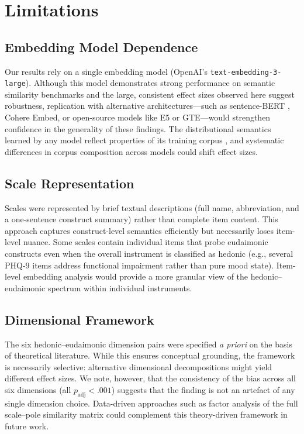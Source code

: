 \documentclass[12pt,a4paper]{article}
\begin{document}
\section{Limitations}\label{sec:limitations}

\subsection{Embedding Model Dependence}

Our results rely on a single embedding model (OpenAI's \texttt{text-embedding-3-large}).
Although this model demonstrates strong performance on semantic similarity benchmarks and the large, consistent effect sizes observed here suggest robustness, replication with alternative architectures---such as sentence-BERT \citep{devlin2019bert}, Cohere Embed, or open-source models like E5 or GTE---would strengthen confidence in the generality of these findings.
The distributional semantics learned by any model reflect properties of its training corpus \citep{bender2021dangers}, and systematic differences in corpus composition across models could shift effect sizes.

\subsection{Scale Representation}

Scales were represented by brief textual descriptions (full name, abbreviation, and a one-sentence construct summary) rather than complete item content.
This approach captures construct-level semantics efficiently but necessarily loses item-level nuance.
Some scales contain individual items that probe eudaimonic constructs even when the overall instrument is classified as hedonic (e.g., several PHQ-9 items address functional impairment rather than pure mood state).
Item-level embedding analysis would provide a more granular view of the hedonic--eudaimonic spectrum within individual instruments.

\subsection{Dimensional Framework}

The six hedonic--eudaimonic dimension pairs were specified \textit{a priori} on the basis of theoretical literature.
While this ensures conceptual grounding, the framework is necessarily selective: alternative dimensional decompositions might yield different effect sizes.
We note, however, that the consistency of the bias across all six dimensions (all $p_{\text{adj}} < .001$) suggests that the finding is not an artefact of any single dimension choice.
Data-driven approaches such as factor analysis of the full scale--pole similarity matrix could complement this theory-driven framework in future work.
\end{document}
